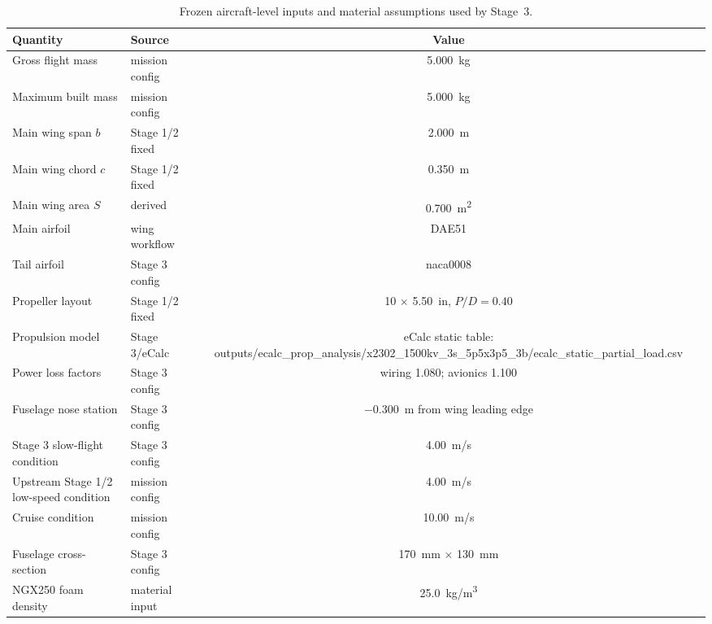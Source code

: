 \documentclass[11pt]{article}
\begin{document}
\begin{table}[H]
\centering
\begin{tabular}{llc}
\toprule
Quantity & Source & Value \\
\midrule
Gross flight mass & mission config & \SI{5.000}{kg} \\
Maximum built mass & mission config & \SI{5.000}{kg} \\
Main wing span \(b\) & Stage 1/2 fixed & \SI{2.000}{m} \\
Main wing chord \(c\) & Stage 1/2 fixed & \SI{0.350}{m} \\
Main wing area \(S\) & derived & \SI{0.700}{m^2} \\
Main airfoil & wing workflow & DAE51 \\
Tail airfoil & Stage 3 config & naca0008 \\
Propeller layout & Stage 1/2 fixed & 10 \(\times\) \SI{5.50}{in}, \(P/D=0.40\) \\
Propulsion model & Stage 3/eCalc & eCalc static table: outputs/ecalc\_prop\_analysis/x2302\_1500kv\_3s\_5p5x3p5\_3b/ecalc\_static\_partial\_load.csv \\
Power loss factors & Stage 3 config & wiring 1.080; avionics 1.100 \\
Fuselage nose station & Stage 3 config & \SI{-0.300}{m} from wing leading edge \\
Stage 3 slow-flight condition & Stage 3 config & \SI{4.00}{m/s} \\
Upstream Stage 1/2 low-speed condition & mission config & \SI{4.00}{m/s} \\
Cruise condition & mission config & \SI{10.00}{m/s} \\
Fuselage cross-section & Stage 3 config & \SI{170}{mm} \(\times\) \SI{130}{mm} \\
NGX250 foam density & material input & \SI{25.0}{kg/m^3} \\
\bottomrule
\end{tabular}
\caption{Frozen aircraft-level inputs and material assumptions used by Stage~3.}
\label{tab:stage3-fixed-inputs}
\end{table}
\end{document}
